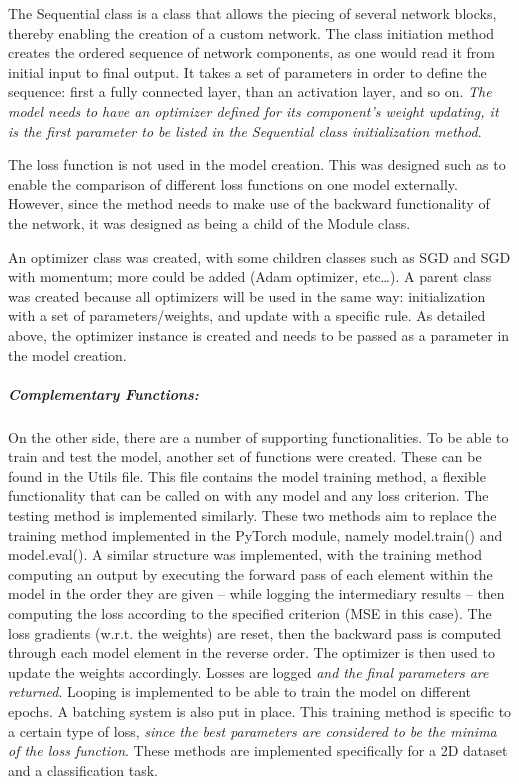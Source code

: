 \documentclass[11pt, a4paper]{article}
\begin{document}
The Sequential class is a class that allows the piecing of several network blocks, thereby enabling the creation of a custom network. The class initiation method creates the ordered sequence of network components, as one would read it from initial input to final output. It takes a set of parameters in order to define the sequence: first a fully connected layer, than an activation layer, and so on. \textit{The model needs to have an optimizer defined for its component's weight updating, it is the first parameter to be listed in the Sequential class initialization method}.

The loss function is not used in the model creation. This was designed such as to enable the comparison of different loss functions on one model externally. However, since the method needs to make use of the backward functionality of the network, it was designed as being a child of the Module class.

An optimizer class was created, with some children classes such as SGD and SGD with momentum; more could be added (Adam optimizer, etc…). A parent class was created because all optimizers will be used in the same way: initialization with a set of parameters/weights, and update with a specific rule. As detailed above, the optimizer instance is created and needs to be passed as a parameter in the model creation.


\subparagraph{Complementary Functions:}
On the other side, there are a number of supporting functionalities. To be able to train and test the model, another set of functions were created. These can be found in the Utils file. This file contains the model training method, a flexible functionality that can be called on with any model and any loss criterion. The testing method is implemented similarly. These two methods aim to replace the training method implemented in the PyTorch module, namely model.train() and model.eval(). A similar structure was implemented, with the training method computing an output by executing the forward pass of each element within the model in the order they are given -- while logging the intermediary results -- then computing the loss according to the specified criterion (MSE in this case). The loss gradients (w.r.t. the weights) are reset, then the backward pass is computed through each model element in the reverse order. The optimizer is then used to update the weights accordingly. Losses are logged \textit{and the final parameters are returned}. Looping is implemented to be able to train the model on different epochs. A batching system is also put in place. This training method is specific to a certain type of loss, \textit{since the best parameters are considered to be the minima of the loss function}. These methods are implemented specifically for a 2D dataset and a classification task.
\end{document}
